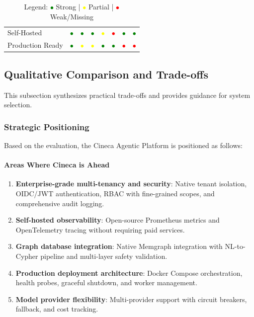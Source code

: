 \begin{table}[ht]
\begin{tabular}{lccccccc}
Self-Hosted & \textcolor{green}{$\bullet$} & \textcolor{green}{$\bullet$} & \textcolor{green}{$\bullet$} & \textcolor{yellow}{$\bullet$} & \textcolor{red}{$\bullet$} & \textcolor{green}{$\bullet$} & \textcolor{green}{$\bullet$} \\
Production Ready & \textcolor{green}{$\bullet$} & \textcolor{yellow}{$\bullet$} & \textcolor{yellow}{$\bullet$} & \textcolor{green}{$\bullet$} & \textcolor{green}{$\bullet$} & \textcolor{red}{$\bullet$} & \textcolor{red}{$\bullet$} \\
\hline
\end{tabular}
\caption*{Legend: \textcolor{green}{$\bullet$} Strong | \textcolor{yellow}{$\bullet$} Partial | \textcolor{red}{$\bullet$} Weak/Missing}
\end{table}

\subsection{Qualitative Comparison and Trade-offs}
\label{subsec:qualitative-comparison}

This subsection synthesizes practical trade-offs and provides guidance for system selection.

\subsubsection{Strategic Positioning}

Based on the evaluation, the Cineca Agentic Platform is positioned as follows:

\paragraph{Areas Where Cineca is Ahead}
\begin{enumerate}
    \item \textbf{Enterprise-grade multi-tenancy and security}: Native tenant isolation, OIDC/JWT authentication, RBAC with fine-grained scopes, and comprehensive audit logging.
    
    \item \textbf{Self-hosted observability}: Open-source Prometheus metrics and OpenTelemetry tracing without requiring paid services.
    
    \item \textbf{Graph database integration}: Native Memgraph integration with NL-to-Cypher pipeline and multi-layer safety validation.
    
    \item \textbf{Production deployment architecture}: Docker Compose orchestration, health probes, graceful shutdown, and worker management.
    
    \item \textbf{Model provider flexibility}: Multi-provider support with circuit breakers, fallback, and cost tracking.
\end{enumerate}


